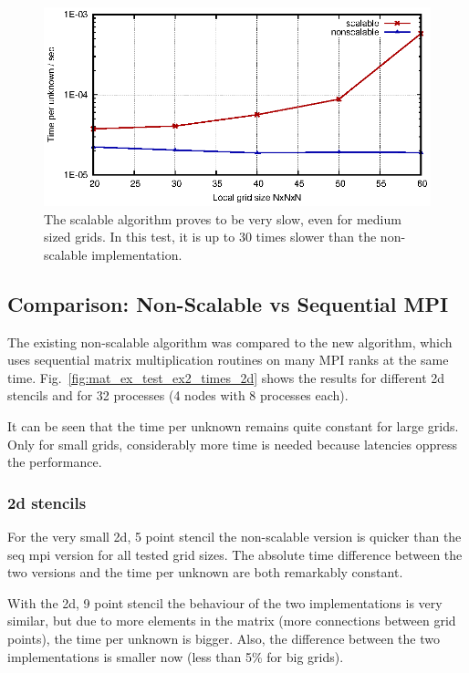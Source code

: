 \begin{figure}[tbp]
	\centering
	\includegraphics[width=1\textwidth]{scalable}
	\caption{The scalable algorithm proves to be very slow, even for medium sized grids. In this test, it is up to 30 times slower than the non-scalable implementation.} 
	\label{fig:scalable}
\end{figure}

\subsection{Comparison: Non-Scalable vs Sequential MPI}
The existing non-scalable algorithm was compared to the new algorithm, which uses sequential matrix multiplication routines on many MPI ranks at the same time. Fig.~\ref{fig:mat_ex_test_ex2_times_2d} shows the results for different 2d stencils and for 32 processes (4 nodes with 8 processes each). 

It can be seen that the time per unknown remains quite constant for large grids. Only for small grids, considerably more time is needed because latencies oppress the performance.

\subsubsection*{2d stencils}
For the very small 2d, 5 point stencil the non-scalable version is quicker than the seq mpi version for all tested grid sizes. The absolute time difference between the two versions and the time per unknown are both remarkably constant. 

With the 2d, 9 point stencil the behaviour of the two implementations is very similar, but due to more elements in the matrix (more connections between grid points), the time per unknown is bigger. Also, the difference between the two implementations is smaller now (less than 5\% for big grids). 

